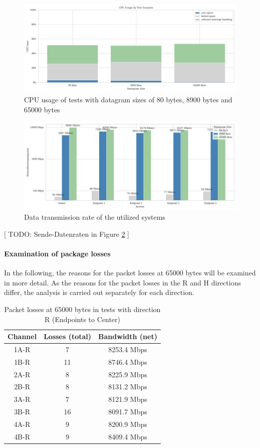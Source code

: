 \documentclass[11pt]{article}
\begin{document}
\begin{figure}[h]
	\includegraphics[width=\textwidth]{su1.png}
	\centering
	\caption{CPU usage of tests with datagram sizes of 80 bytes, 8900 bytes and 65000 bytes}
    \label{fig:su1}
\end{figure}

\begin{figure}[h]
	\includegraphics[width=\textwidth]{su3.png}
	\centering
	\caption{Data transmission rate of the utilized systems}
    \label{fig:su3}
\end{figure}

[
TODO: Sende-Datenraten in Figure \ref{fig:su3}
]



\paragraph*{Examination of package losses}
In the following, the reasons for the packet losses at 65000 bytes will be examined in more detail. As the reasons for the packet losses in the R and H directions differ, the analysis is carried out separately for each direction.

\begin{table}[h]
\centering
\begin{tabular}{||c c c||} 
 \hline
 Channel & Losses (total) & Bandwidth (net) \\ [0.5ex] 
 \hline\hline
 1A-R & 7  & 8253.4 Mbps \\ 
 1B-R & 11 & 8746.4 Mbps \\
 2A-R & 8  & 8225.9 Mbps \\
 2B-R & 8  & 8131.2 Mbps \\
 3A-R & 7  & 8121.9 Mbps \\
 3B-R & 16 & 8091.7 Mbps \\
 4A-R & 9  & 8200.9 Mbps \\
 4B-R & 9  & 8409.4 Mbps \\ [1ex] 
 \hline
\end{tabular}
\caption{ Packet losses at 65000 bytes in tests with direction R (Endpoints to Center)}
\label{table:1}
\end{table}
\end{document}
